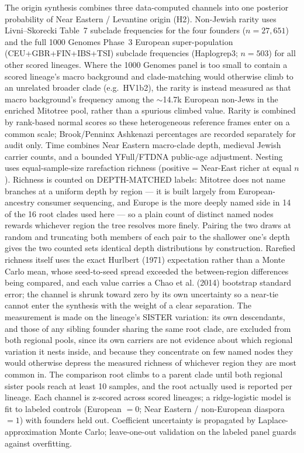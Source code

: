 \documentclass[11pt]{article}
\begin{document}
The origin synthesis combines three data-computed channels into one posterior probability of Near Eastern / Levantine origin (H2). Non-Jewish rarity uses Livni--Skorecki Table~7 subclade frequencies for the four founders ($n=27{,}651$) and the full 1000 Genomes Phase~3 European super-population (CEU+GBR+FIN+IBS+TSI) subclade frequencies (Haplogrep3; $n=503$) for all other scored lineages. Where the 1000 Genomes panel is too small to contain a scored lineage's macro background and clade-matching would otherwise climb to an unrelated broader clade (e.g.\ HV1b2), the rarity is instead measured as that macro background's frequency among the $\sim$14.7k European non-Jews in the enriched Mitotree pool, rather than a spurious climbed value. Rarity is combined by rank-based normal scores so these heterogeneous reference frames enter on a common scale; Brook/Penninx Ashkenazi percentages are recorded separately for audit only. Time combines Near Eastern macro-clade depth, medieval Jewish carrier counts, and a bounded YFull/FTDNA public-age adjustment. Nesting uses equal-sample-size rarefaction richness (positive = Near-East richer at equal $n$). Richness is counted on DEPTH-MATCHED labels: Mitotree does not name branches at a uniform depth by region --- it is built largely from European-ancestry consumer sequencing, and Europe is the more deeply named side in 14 of the 16 root clades used here --- so a plain count of distinct named nodes rewards whichever region the tree resolves more finely. Pairing the two draws at random and truncating both members of each pair to the shallower one's depth gives the two counted sets identical depth distributions by construction. Rarefied richness itself uses the exact Hurlbert (1971) expectation rather than a Monte Carlo mean, whose seed-to-seed spread exceeded the between-region differences being compared, and each value carries a Chao et al. (2014) bootstrap standard error; the channel is shrunk toward zero by its own uncertainty so a near-tie cannot enter the synthesis with the weight of a clear separation. The measurement is made on the lineage's SISTER variation: its own descendants, and those of any sibling founder sharing the same root clade, are excluded from both regional pools, since its own carriers are not evidence about which regional variation it nests inside, and because they concentrate on few named nodes they would otherwise depress the measured richness of whichever region they are most common in. The comparison root climbs to a parent clade until both regional sister pools reach at least 10 samples, and the root actually used is reported per lineage. Each channel is z-scored across scored lineages; a ridge-logistic model is fit to labeled controls (European $=0$; Near Eastern / non-European diaspora $=1$) with founders held out. Coefficient uncertainty is propagated by Laplace-approximation Monte Carlo; leave-one-out validation on the labeled panel guards against overfitting.
\end{document}
